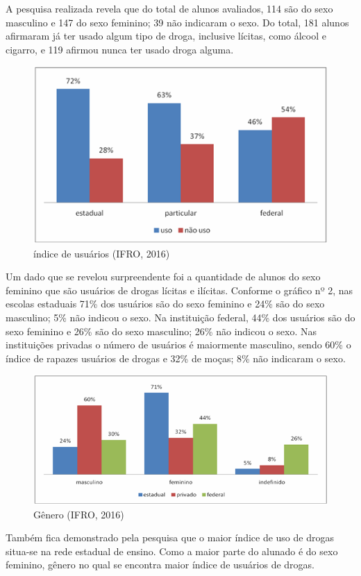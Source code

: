 \documentclass[article,12pt,onesidea,4paper,english,brazil]{abntex2}
\begin{document}
A pesquisa realizada revela que do total de alunos avaliados, 114 são do sexo masculino e 147 do sexo feminino; 39 não indicaram o sexo. Do total, 181 alunos afirmaram já ter usado algum tipo de droga, inclusive lícitas, como álcool e cigarro, e 119 afirmou nunca ter usado droga alguma.
\begin{figure}[h]
	\centering
	\includegraphics[width=0.7\linewidth]{pip-artigo13-01}
	\caption{índice de usuários (IFRO, 2016)}
	\label{fig:pip-artigo13-01}
\end{figure}

Um dado que se revelou surpreendente foi a quantidade de alunos do sexo feminino que são usuários de drogas lícitas e ilícitas. Conforme o gráfico nº 2, nas escolas estaduais 71\% dos usuários são do sexo feminino e 24\% são do sexo masculino; 5\% não indicou o sexo. Na instituição federal, 44\% dos usuários são do sexo feminino e 26\% são do sexo masculino; 26\% não indicou o sexo. Nas instituições privadas o número de usuários é maiormente masculino, sendo 60\% o índice de rapazes usuários de drogas e 32\% de moças; 8\% não indicaram o sexo.
\begin{figure}[h]
	\centering
	\includegraphics[width=0.7\linewidth]{pip-artigo13-02}
	\caption{Gênero (IFRO, 2016)}
	\label{fig:pip-artigo13-02}
\end{figure}

	Também fica demonstrado pela pesquisa que o maior índice de uso de drogas situa-se na rede estadual de ensino. Como a maior parte do alunado é do sexo feminino, gênero no qual se encontra maior índice de usuários de drogas.
	
\end{document}

